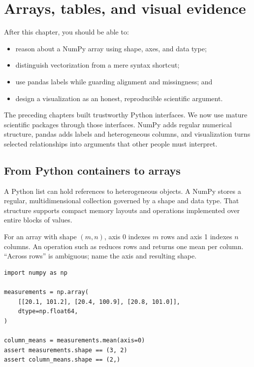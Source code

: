 \chapter{Arrays, tables, and visual evidence}
\label{ch:arrays-tables-viz}

\begin{learningobjectives}
After this chapter, you should be able to:
\begin{itemize}
  \item reason about a NumPy array using shape, axes, and data type;
  \item distinguish vectorization from a mere syntax shortcut;
  \item use pandas labels while guarding alignment and missingness; and
  \item design a visualization as an honest, reproducible scientific argument.
\end{itemize}
\end{learningobjectives}

\begin{chapterconnection}
The preceding chapters built trustworthy Python interfaces. We now use mature
scientific packages through those interfaces. NumPy adds regular numerical
structure, pandas adds labels and heterogeneous columns, and visualization
turns selected relationships into arguments that other people must interpret.
\end{chapterconnection}

\section{From Python containers to arrays}

A Python list can hold references to heterogeneous objects. A NumPy
 stores a regular, multidimensional collection governed by a shape
and data type. That structure supports compact memory layouts and operations
implemented over entire blocks of values.

For an array with shape $(m,n)$, axis 0 indexes $m$ rows and axis 1 indexes $n$
columns. An operation such as  reduces rows and returns one
mean per column. ``Across rows'' is ambiguous; name the axis and resulting
shape.

\begin{lstlisting}
import numpy as np

measurements = np.array(
    [[20.1, 101.2], [20.4, 100.9], [20.8, 101.0]],
    dtype=np.float64,
)

column_means = measurements.mean(axis=0)
assert measurements.shape == (3, 2)
assert column_means.shape == (2,)
\end{lstlisting}

